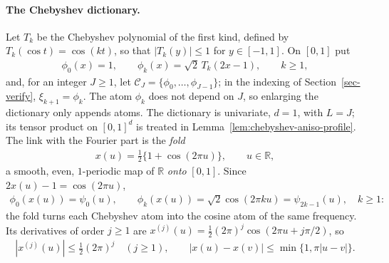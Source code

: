 \paragraph*{The Chebyshev dictionary.}
Let $T_k$ be the Chebyshev polynomial of the first kind, defined by $T_k(\cos t)=\cos(kt)$, so that $|T_k(y)|\leq1$ for $y\in[-1,1]$. On $[0,1]$ put
\begin{align*}
\phi_0(x)=1,
\qquad
\phi_k(x)=\sqrt2\,T_k(2x-1),\qquad k\geq1,
\end{align*}
and, for an integer $J\geq1$, let $\mathcal C_J=\{\phi_0,\ldots,\phi_{J-1}\}$; in the indexing of Section~\ref{sec-verify}, $\xi_{k+1}=\phi_k$. The atom $\phi_k$ does not depend on $J$, so enlarging the dictionary only appends atoms. The dictionary is univariate, $d=1$, with $L=J$; its tensor product on $[0,1]^d$ is treated in Lemma~\ref{lem:chebyshev-aniso-profile}. The link with the Fourier part is the \emph{fold}
\begin{align}
x(u)=\tfrac12\{1+\cos(2\pi u)\},\qquad u\in\mathbb R,
\label{eq:cheb-fold}
\end{align}
a smooth, even, $1$-periodic map of $\mathbb R$ \emph{onto} $[0,1]$. Since $2x(u)-1=\cos(2\pi u)$,
\begin{align}
\phi_0(x(u))=\psi_0(u),
\qquad
\phi_k(x(u))=\sqrt2\cos(2\pi ku)=\psi_{2k-1}(u),\quad k\geq1:
\label{eq:cheb-atoms}
\end{align}
the fold turns each Chebyshev atom into the cosine atom of the same frequency. Its derivatives of order $j\geq1$ are $x^{(j)}(u)=\tfrac12(2\pi)^j\cos(2\pi u+j\pi/2)$, so
\begin{align}
|x^{(j)}(u)|\leq\tfrac12(2\pi)^j\quad(j\geq1),
\qquad
|x(u)-x(v)|\leq\min\{1,\pi|u-v|\}.
\label{eq:cheb-fold-bounds}
\end{align}

